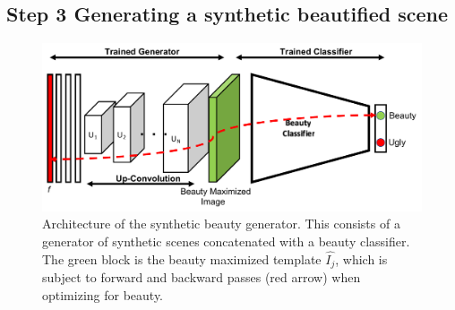 

\subsection*{Step 3 Generating a synthetic beautified scene}

\begin{figure}[t!]
    \centering
    \includegraphics[width=\columnwidth]{Plot/AM_arch.pdf}
    \caption{Architecture of the synthetic beauty generator. This consists of a generator of synthetic scenes concatenated with a beauty classifier. The green block is the beauty maximized template $\hat{I_j}$, which is subject to  forward and backward passes (red arrow) when optimizing for beauty.}
    \label{fig:AM_arch}
\end{figure}

